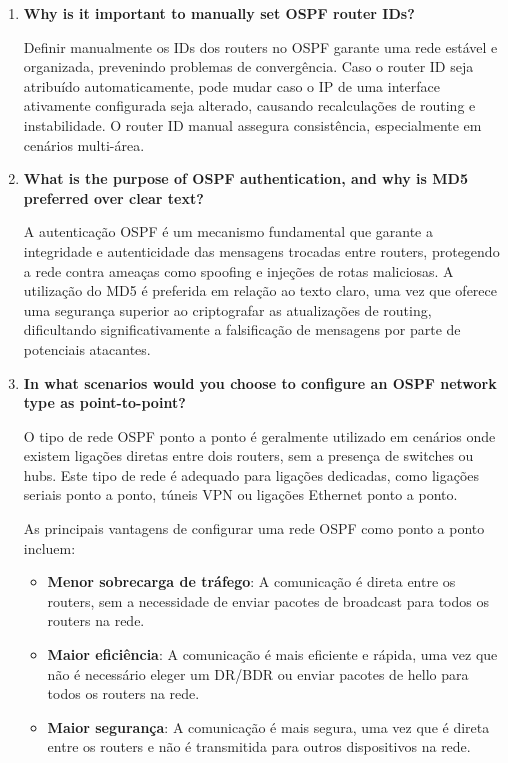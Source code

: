 \documentclass[11pt,english, openright, oneside]{book}
\begin{document}
\begin{enumerate}
  \item \textbf{Why is it important to manually set OSPF router IDs?} 
  \vspace{0.2cm}

  \par Definir manualmente os IDs dos routers no OSPF garante uma rede estável e organizada, prevenindo problemas de convergência. Caso o router ID seja atribuído automaticamente, pode mudar caso o IP de uma interface ativamente configurada seja alterado, causando recalculações de routing e instabilidade. O router ID manual assegura consistência, especialmente em cenários multi-área.
  \vspace{0.2cm}

  \item \textbf{What is the purpose of OSPF authentication, and why is MD5 preferred over clear text?}
  \vspace{0.2cm}

  \par A autenticação OSPF é um mecanismo fundamental que garante a integridade e autenticidade das mensagens trocadas entre routers, protegendo a rede contra ameaças como spoofing e injeções de rotas maliciosas. A utilização do MD5 é preferida em relação ao texto claro, uma vez que oferece uma segurança superior ao criptografar as atualizações de routing, dificultando significativamente a falsificação de mensagens por parte de potenciais atacantes.
  \vspace{0.2cm}

  \item \textbf{In what scenarios would you choose to configure an OSPF network type as point-to-point?}
  \vspace{0.2cm}

  \par O tipo de rede OSPF ponto a ponto é geralmente utilizado em cenários onde existem ligações diretas entre dois routers, sem a presença de switches ou hubs. Este tipo de rede é adequado para ligações dedicadas, como ligações seriais ponto a ponto, túneis VPN ou ligações Ethernet ponto a ponto.
  \vspace{0.2cm}

  \par As principais vantagens de configurar uma rede OSPF como ponto a ponto incluem:
  \begin{itemize}
    \item \textbf{Menor sobrecarga de tráfego}: A comunicação é direta entre os routers, sem a necessidade de enviar pacotes de broadcast para todos os routers na rede.
    \item \textbf{Maior eficiência}: A comunicação é mais eficiente e rápida, uma vez que não é necessário eleger um DR/BDR ou enviar pacotes de hello para todos os routers na rede.
    \item \textbf{Maior segurança}: A comunicação é mais segura, uma vez que é direta entre os routers e não é transmitida para outros dispositivos na rede.
  \end{itemize}


\end{enumerate}
\end{document}
